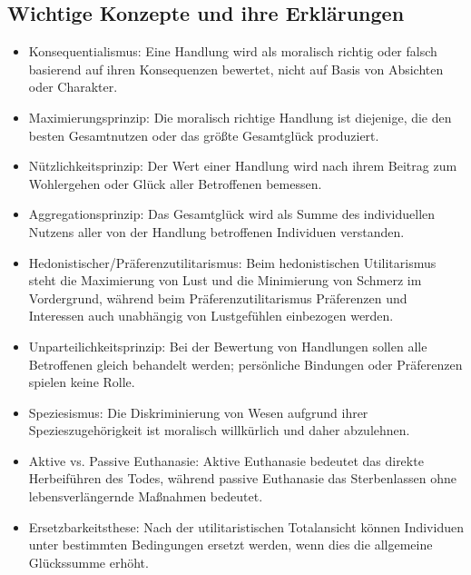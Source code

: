 \documentclass{article}
\begin{document}
\subsection{Wichtige Konzepte und ihre Erklärungen}
\begin{itemize}
	\item Konsequentialismus: Eine Handlung wird als moralisch richtig oder falsch basierend auf ihren Konsequenzen bewertet, nicht auf Basis von Absichten oder Charakter.

	\item Maximierungsprinzip: Die moralisch richtige Handlung ist diejenige, die den besten Gesamtnutzen oder das größte Gesamtglück produziert.

	\item Nützlichkeitsprinzip: Der Wert einer Handlung wird nach ihrem Beitrag zum Wohlergehen oder Glück aller Betroffenen bemessen.

	\item Aggregationsprinzip: Das Gesamtglück wird als Summe des individuellen Nutzens aller von der Handlung betroffenen Individuen verstanden.

	\item Hedonistischer/Präferenzutilitarismus: Beim hedonistischen Utilitarismus steht die Maximierung von Lust und die Minimierung von Schmerz im Vordergrund, während beim Präferenzutilitarismus Präferenzen und Interessen auch unabhängig von Lustgefühlen einbezogen werden.

	\item Unparteilichkeitsprinzip: Bei der Bewertung von Handlungen sollen alle Betroffenen gleich behandelt werden; persönliche Bindungen oder Präferenzen spielen keine Rolle.

	\item Speziesismus: Die Diskriminierung von Wesen aufgrund ihrer Spezieszugehörigkeit ist moralisch willkürlich und daher abzulehnen.

	\item Aktive vs. Passive Euthanasie: Aktive Euthanasie bedeutet das direkte Herbeiführen des Todes, während passive Euthanasie das Sterbenlassen ohne lebensverlängernde Maßnahmen bedeutet.

	\item Ersetzbarkeitsthese: Nach der utilitaristischen Totalansicht können Individuen unter bestimmten Bedingungen ersetzt werden, wenn dies die allgemeine Glückssumme erhöht.
\end{itemize}
\end{document}
